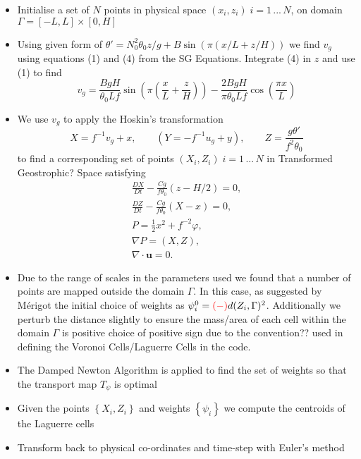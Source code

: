 \documentclass[]{article}
\begin{document}
	\begin{itemize}
	\item Initialise a set of $N$ points in physical space $(x_i,z_i) \; i = 1\,...\,N$, on domain $\Gamma = [-L,L] \times [0,H]$
	\item Using given form of $\theta ' = N_0^2 \theta_0 z /g + B\sin(\pi(x/L +z/H))$ we find $v_g$ using equations (1) and (4) from the SG Equations. Integrate (4) in $z$ and use (1) to find 
	\begin{equation}
		v_g = \frac{BgH}{\theta_0 Lf}\sin\left( \pi \left( \frac{x}{L} + \frac{z}{H}\right)\right) - \frac{2BgH}{\pi \theta_0 Lf}\cos\left(\frac{\pi x}{L}\right)
	\end{equation}
	\item We use $v_g$ to apply the Hoskin's transformation \cite{Hoskins1975}
	\begin{equation*}
	X = f^{-1}v_g + x,\qquad \left(Y = -f^{-1}u_g + y\right), \qquad Z = \frac{g\theta'}{f^2\theta_0}
	\end{equation*}
	to find a corresponding set of points $(X_i,Z_i) \; i = 1 \,...\,N$ in Transformed \color{red} Geostrophic?\color{black} Space satisfying
	\begin{align*}
	\frac{DX}{Dt} -\frac{Cg}{f\theta _0}\left(z-H/2\right) = 0,\\
	\frac{DZ}{Dt} - \frac{Cg}{f\theta _0}\left(X-x\right) = 0,\\
	P = \frac{1}{2}x^2 + f^{-2}\varphi,\\
	\nabla P = \left( X, Z\right),\\
	\nabla \cdot \bm{u} = 0.
	\end{align*}
	\item Due to the range of scales in the parameters used we found that a number of points are mapped outside the domain $\Gamma$. In this case, as suggested by M\'{e}rigot \cite{Merigot2017} the initial choice of weights as $\psi_i^0 = \color{red}(-)\color{black}d(Z_i,\Gamma)^2$. Additionally we perturb the distance slightly to ensure the mass/area of each cell within the domain $\Gamma$ is positive \color{red} choice of positive sign due to the convention?? used in defining the Voronoi Cells/Laguerre Cells in the code.\color{black} 
	\item The Damped Newton Algorithm is applied to find the set of weights so that the transport map $T_\psi$ is optimal 
	\item Given the points $\left\lbrace X_i,Z_i\right\rbrace $ and weights $\left\lbrace \psi_i \right\rbrace $ we compute the centroids of the Laguerre cells
	\item Transform back to physical co-ordinates and time-step with Euler's method
	 \end{itemize}
\end{document}
